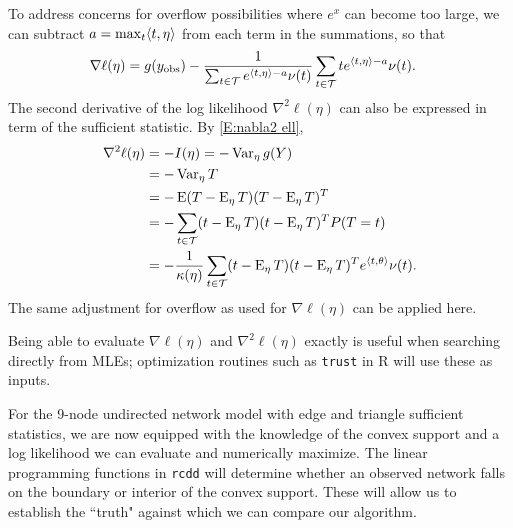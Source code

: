 To address concerns for overflow possibilities where $e^x$ can become too large, we 
can subtract $a = \max_t \langle t, \eta \rangle$ from each term in the summations, so that
\begin{align*}
	\nabla \ell (\eta) &= g(y_{\textrm{obs}}) - \frac{1}{\sum_{t \in {\mathcal T}} e^{\langle t,\eta \rangle-a} \nu(t)}  \sum_{t \in {\mathcal T}} t e^{\langle t,\eta \rangle-a} \nu(t).
\end{align*}
The second derivative of the log likelihood $\nabla ^2 \ell(\eta)$ can also be 
expressed in term of the sufficient statistic.  By \eqref{E:nabla2 ell},
\begin{align*}
	\nabla ^2 \ell(\eta) &= - I(\eta) = -\operatorname{Var}_\eta g(Y) \\
	&= -\operatorname{Var}_\eta T \\ 
	&= - \operatorname{E} (T - \operatorname{E}_\eta T)( T - \operatorname{E}_\eta T)^T \\
				&= - \sum_{t \in {\mathcal T}} (t - \operatorname{E}_\eta T)(t - \operatorname{E}_\eta T)^T P(T=t)\\
				&= - \frac{1}{\kappa(\eta)} \sum_{t\in {\mathcal T}}
					(t - \operatorname{E}_\eta T)(t - \operatorname{E}_\eta T)^T e^{\langle t,\theta \rangle} \nu(t).
\end{align*}
The same adjustment for overflow as used for $\nabla \ell(\eta)$ can be applied here.

Being able to evaluate $\nabla \ell(\eta)$ and 
$\nabla^2 \ell(\eta)$ exactly is useful when searching directly from MLEs;
optimization routines such as \texttt{trust} \citep{trust:R} in R will use these
as inputs.  

For the 9-node undirected network model with edge and triangle sufficient statistics,
we are now equipped with the knowledge of the convex support and a log likelihood we 
can evaluate and numerically maximize.  The linear programming functions in 
\texttt{rcdd} will determine whether an observed network falls on the boundary 
or interior of the convex support.  These will allow us to establish the ``truth" 
against which we can compare our algorithm.


